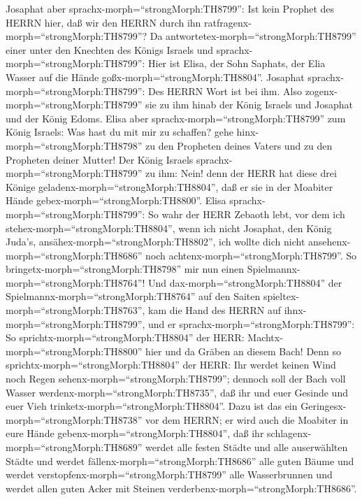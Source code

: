 Josaphat aber sprachx-morph=``strongMorph:TH8799'': Ist kein Prophet des
HERRN hier, daß wir den HERRN durch ihn
ratfragenx-morph=``strongMorph:TH8799''? Da
antwortetex-morph=``strongMorph:TH8799'' einer unter den Knechten des
Königs Israels und sprachx-morph=``strongMorph:TH8799'': Hier ist Elisa,
der Sohn Saphats, der Elia Wasser auf die Hände
goßx-morph=``strongMorph:TH8804''.  Josaphat
sprachx-morph=``strongMorph:TH8799'': Des HERRN Wort ist bei ihm. Also
zogenx-morph=``strongMorph:TH8799'' sie zu ihm hinab der König Israels
und Josaphat und der König Edoms.  Elisa aber
sprachx-morph=``strongMorph:TH8799'' zum König Israels: Was hast du mit
mir zu schaffen? gehe hinx-morph=``strongMorph:TH8798'' zu den Propheten
deines Vaters und zu den Propheten deiner Mutter! Der König Israels
sprachx-morph=``strongMorph:TH8799'' zu ihm: Nein! denn der HERR hat
diese drei Könige geladenx-morph=``strongMorph:TH8804'', daß er sie in
der Moabiter Hände gebex-morph=``strongMorph:TH8800''. 
Elisa sprachx-morph=``strongMorph:TH8799'': So wahr der HERR Zebaoth
lebt, vor dem ich stehex-morph=``strongMorph:TH8804'', wenn ich nicht
Josaphat, den König Juda's, ansähex-morph=``strongMorph:TH8802'', ich
wollte dich nicht ansehenx-morph=``strongMorph:TH8686'' noch
achtenx-morph=``strongMorph:TH8799''.  So
bringetx-morph=``strongMorph:TH8798'' mir nun einen
Spielmannx-morph=``strongMorph:TH8764''! Und
dax-morph=``strongMorph:TH8804'' der
Spielmannx-morph=``strongMorph:TH8764'' auf den Saiten
spieltex-morph=``strongMorph:TH8763'', kam die Hand des HERRN auf
ihnx-morph=``strongMorph:TH8799'',  und er
sprachx-morph=``strongMorph:TH8799'': So
sprichtx-morph=``strongMorph:TH8804'' der HERR:
Machtx-morph=``strongMorph:TH8800'' hier und da Gräben an diesem Bach!
 Denn so sprichtx-morph=``strongMorph:TH8804'' der HERR:
Ihr werdet keinen Wind noch Regen sehenx-morph=``strongMorph:TH8799'';
dennoch soll der Bach voll Wasser werdenx-morph=``strongMorph:TH8735'',
daß ihr und euer Gesinde und euer Vieh
trinketx-morph=``strongMorph:TH8804''.  Dazu ist das ein
Geringesx-morph=``strongMorph:TH8738'' vor dem HERRN; er wird auch die
Moabiter in eure Hände gebenx-morph=``strongMorph:TH8804'',
 daß ihr schlagenx-morph=``strongMorph:TH8689'' werdet alle
festen Städte und alle auserwählten Städte und werdet
fällenx-morph=``strongMorph:TH8686'' alle guten Bäume und werdet
verstopfenx-morph=``strongMorph:TH8799'' alle Wasserbrunnen und werdet
allen guten Acker mit Steinen verderbenx-morph=``strongMorph:TH8686''.
